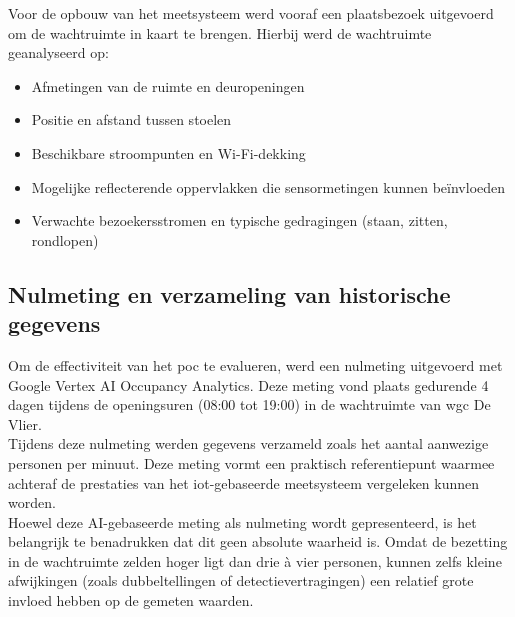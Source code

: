 Voor de opbouw van het meetsysteem werd vooraf een plaatsbezoek uitgevoerd om de wachtruimte in kaart te brengen. Hierbij werd de wachtruimte geanalyseerd op:

\begin{itemize}
    \item Afmetingen van de ruimte en deuropeningen
    \item Positie en afstand tussen stoelen
    \item Beschikbare stroompunten en Wi-Fi-dekking
    \item Mogelijke reflecterende oppervlakken die sensormetingen kunnen beïnvloeden
    \item Verwachte bezoekersstromen en typische gedragingen (staan, zitten, rondlopen)
\end{itemize}



\subsection{Nulmeting en verzameling van historische gegevens}
Om de effectiviteit van het \gls{poc} te evalueren, werd een nulmeting uitgevoerd met Google Vertex AI Occupancy Analytics. Deze meting vond plaats gedurende 4 dagen tijdens de openingsuren (08:00 tot 19:00) in de wachtruimte van \gls{wgc} De Vlier. \\

Tijdens deze nulmeting werden gegevens verzameld zoals het aantal aanwezige personen per minuut. Deze meting vormt een praktisch referentiepunt waarmee achteraf de prestaties van het \gls{iot}-gebaseerde meetsysteem vergeleken kunnen worden. \\

Hoewel deze AI-gebaseerde meting als nulmeting wordt gepresenteerd, is het belangrijk te benadrukken dat dit geen absolute waarheid is. Omdat de bezetting in de wachtruimte zelden hoger ligt dan drie à vier personen, kunnen zelfs kleine afwijkingen (zoals dubbeltellingen of detectievertragingen) een relatief grote invloed hebben op de gemeten waarden. 

